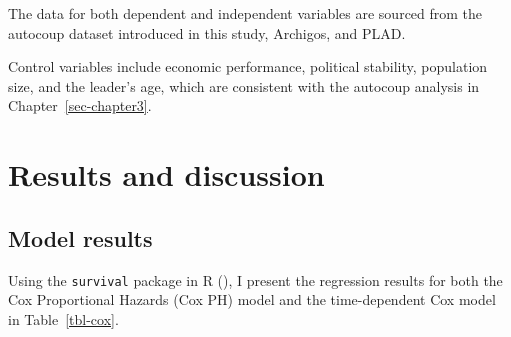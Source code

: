 \documentclass[
  12pt,
]{report}
\begin{document}
The data for both dependent and independent variables are sourced from
the autocoup dataset introduced in this study, Archigos, and PLAD.

Control variables include economic performance, political stability,
population size, and the leader's age, which are consistent with the
autocoup analysis in Chapter~\ref{sec-chapter3}.

\section{Results and discussion}\label{results-and-discussion-1}

\subsection{Model results}\label{model-results}

Using the \texttt{survival} package in R
(), I present the regression
results for both the Cox Proportional Hazards (Cox PH) model and the
time-dependent Cox model in Table~\ref{tbl-cox}.
\end{document}
